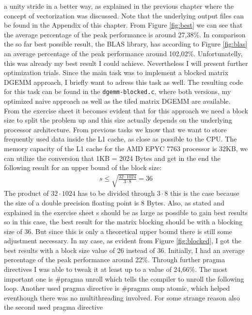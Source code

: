 \documentclass[unicode,11pt,a4paper,oneside,numbers=endperiod,openany]{scrartcl}
\begin{document}
a unity stride in a better way, as explained in the previous chapter where the concept of vectorization was discussed. Note that the underlying 
output files can be found in the Appendix of this chapter. From 
Figure \ref{fig:best} we can see that the average percentage of the peak performance is around 27,38\%. In comparison the so far 
best possible result, the BLAS library, has according to Figure \ref{fig:blas} an average percentage of the peak performance around 102,02\%. 
Unfortunatelly, this was already my best result I could achieve.
\newline
Nevertheless I will present further optimization trials. Since the main task was to implement a blocked matrix DGEMM approach, I briefly 
want to adress this task as well. The resulting code for this task can be found in the \texttt{dgemm-blocked.c}, where both versions, 
my optimized naive approach as well as the tiled matrix DGEMM are available. From the exercise sheet it becomes evident that for this approach 
we need a block size to split the problem up and this size actually depends on the underlying processor architecture. From previous tasks 
we know that we want to store frequently used data inside the L1 cache, as close as possible to the CPU. The memory capacity of the L1 
cache for the AMD EPYC 7763 processor is 32KB, we can utilize the conversion that 1KB = 2024 Bytes and get in the end the following result
for an upper bound of the block size:
\begin{align*}
    s \leq \sqrt{\frac{32 \cdot 1024}{3 \cdot 8}} = 36 
\end{align*}
The product of $32 \cdot 1024$ has to be divided through $3 \cdot 8$ this is the case because the size of a double precision floating point 
is 8 Bytes. Also, as stated and explained in the exercise sheet s should be as large as possible to gain best results so in this case, 
the best result for the matrix blocking should be with a blocking size of 36. But since this is only a theoretical upper bound there is still 
some adjustment necessary. In my case, as evident from Figure \ref{fig:blocked}, I got the best results with a block size value of 26 instead of 36.
\newline
Initially, I had an average percentage of the peak performance around 22\%. Through further pragma directives I was able to tweak it at least up 
to a value of 24,66\%. The most important one is \#pragma unroll which tells the compiler to unroll the following loop. Another used pragma directive 
is \#pragma omp atomic, which helped eventhough there was no multithreading involved. For some strange reason also the second used pragma directive 
\end{document}
